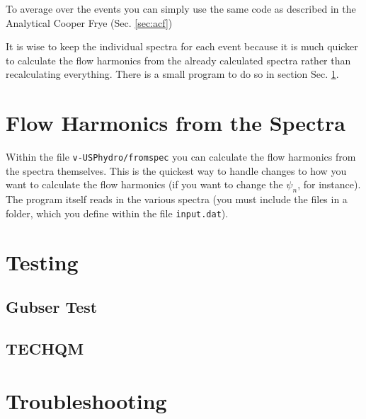 \documentclass[article]{revtex4-1}
\newcommand{\nocode}[1]{\texttt{#1}}
\begin{document}
To average over the events you can simply use the same code as described in the Analytical Cooper Frye (Sec. \ref{sec:acf})

It is wise to keep the individual spectra for each event because it is much quicker to calculate the flow harmonics from the already calculated spectra rather than recalculating everything.  There is a small program to do so in section Sec. \ref{sec:flow}.

\section{Flow Harmonics from the Spectra}\label{sec:flow}

Within the file \nocode{v-USPhydro/fromspec} you can calculate the flow harmonics from the spectra themselves.  This is the quickest way to handle changes to how you want to calculate the flow harmonics (if you want to change the $\psi_n$, for instance).  The program itself reads in the various spectra (you must include the files in a folder, which you define within the file \nocode{input.dat}).  


\section{Testing}\label{sec:tests}

\subsection{Gubser Test}

\subsection{TECHQM}

\section{Troubleshooting}
\end{document}
